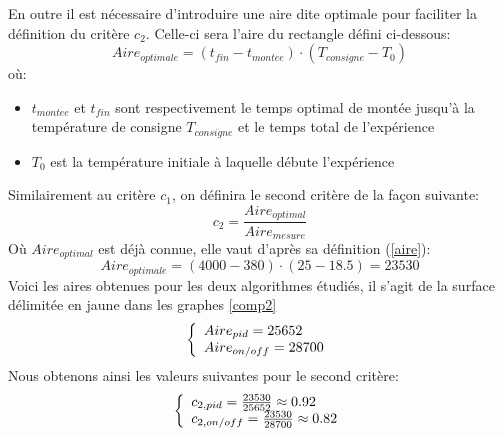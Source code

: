 \documentclass[12pt]{report}
\begin{document}
\noindent
En outre il est nécessaire d'introduire une aire dite optimale pour faciliter la définition du critère $c_2$. Celle-ci sera l'aire du rectangle défini ci-dessous:\\
\begin{equation}
\label{aire}
Aire_{optimale} = (t_{fin} - t_{montee})\cdot(T_{consigne} - T_0)
\end{equation}
où:
\begin{itemize}
\item $t_{montee}$ et $t_{fin}$ sont respectivement le temps optimal de montée jusqu'à la température de consigne $T_{consigne}$ et le temps total de l'expérience
\item $T_0$ est la température initiale à laquelle débute l'expérience
\end{itemize}
\noindent
Similairement au critère $c_1$, on définira le second critère de la façon suivante:\\
\begin{equation}
c_2 = \frac{Aire_{optimal}}{Aire_{mesure}}
\end{equation}
Où $Aire_{optimal}$ est déjà connue, elle vaut d'après sa définition (\ref{aire}):
\begin{equation}
Aire_{optimale} = (4000 - 380)\cdot(25 - 18.5) = 23530
\end{equation}
Voici les aires obtenues pour les deux algorithmes étudiés, il s'agit de la surface délimitée en jaune dans les graphes \ref{comp2}
\[\left\{ 
\begin{array}{l l}
Aire_{pid} = 25652 \\
Aire_{on/off} = 28700\\ 
\end{array} 
\right. \]
\noindent
Nous obtenons ainsi les valeurs suivantes pour le second critère:
\[\left\{ 
\begin{array}{l l}
c_{2, pid} = \frac{23530}{25652} \approx 0.92\\
c_{2, on/off} = \frac{23530}{28700} \approx 0.82\\ 
\end{array} 
\right. \]
\end{document}
